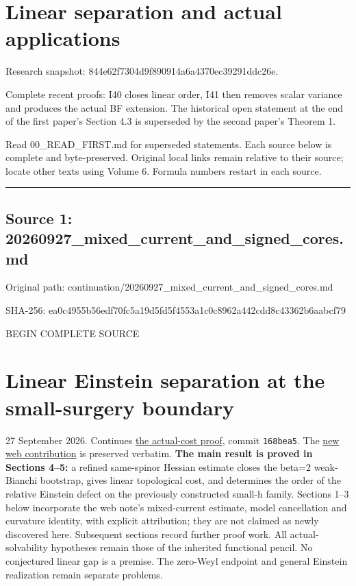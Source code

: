 \documentclass[
  10pt,
]{article}
\author{}
\date{}
\begin{document}
\hypertarget{linear-separation-and-actual-applications}{%
\section{Linear separation and actual
applications}\label{linear-separation-and-actual-applications}}

Research snapshot: 844e62f7304d9f890914a6a4370ec39291ddc26e.

Complete recent proofs: I40 closes linear order, I41 then removes scalar
variance and produces the actual BF extension. The historical open
statement at the end of the first paper's Section 4.3 is superseded by
the second paper's Theorem 1.

Read 00\_READ\_FIRST.md for superseded statements. Each source below is
complete and byte-preserved. Original local links remain relative to
their source; locate other texts using Volume 6. Formula numbers restart
in each source.

\begin{center}\rule{0.5\linewidth}{0.5pt}\end{center}

\hypertarget{source-1-20260927_mixed_current_and_signed_cores.md}{%
\subsection{Source 1:
20260927\_mixed\_current\_and\_signed\_cores.md}\label{source-1-20260927_mixed_current_and_signed_cores.md}}

Original path:
continuation/20260927\_mixed\_current\_and\_signed\_cores.md

SHA-256:
ea0c4955b56edf70fc5a19d5fd5f4553a1c0c8962a442cdd8c43362b6aabcf79

BEGIN COMPLETE SOURCE

\hypertarget{linear-einstein-separation-at-the-small-surgery-boundary}{%
\section{Linear Einstein separation at the small-surgery
boundary}\label{linear-einstein-separation-at-the-small-surgery-boundary}}

27 September 2026. Continues
\href{20260926_actual_topological_cost.md}{the actual-cost proof},
commit \texttt{168bea5}. The
\href{../guidance/source/20260927_web_critical_mixed_term.zh.md}{new web
contribution} is preserved verbatim. \textbf{The main result is proved
in Sections 4--5:} a refined same-spinor Hessian estimate closes the
beta=2 weak-Bianchi bootstrap, gives linear topological cost, and
determines the order of the relative Einstein defect on the previously
constructed small-h family. Sections 1--3 below incorporate the web
note's mixed-current estimate, model cancellation and curvature
identity, with explicit attribution; they are not claimed as newly
discovered here. Subsequent sections record further proof work. All
actual-solvability hypotheses remain those of the inherited functional
pencil. No conjectured linear gap is a premise. The zero-Weyl endpoint
and general Einstein realization remain separate problems.
\end{document}
